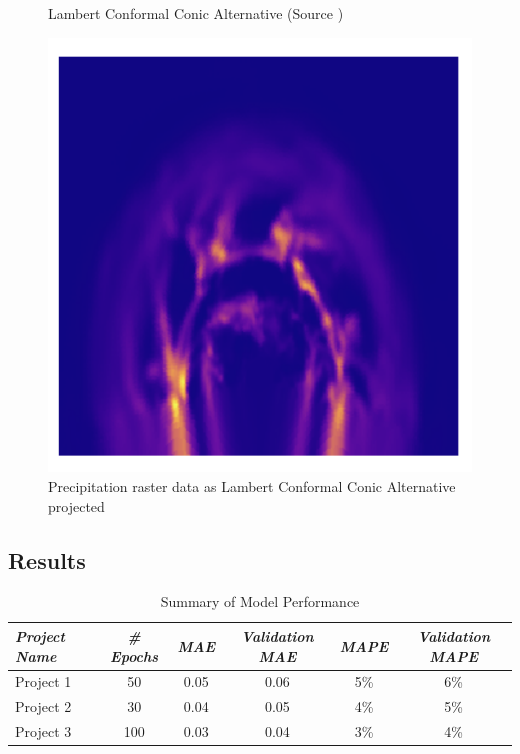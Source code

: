 \begin{figure}[h]
\begin{minipage}{0.30\textwidth}
        \caption{Lambert Conformal Conic Alternative (Source \cite{PROJ_SITE})}
        \label{fig:lcca_proj}
    \end{minipage}\hfill
    \begin{minipage}{0.30\textwidth}
        \centering
        \includegraphics[width=0.9\linewidth]{figures/chapter-8/prect_lcca.png}
        \caption{Precipitation raster data as Lambert Conformal Conic Alternative projected}
        \label{fig:lcca_prect_raster}
    \end{minipage}\hfill
\end{figure}

\subsection{Results}
\begin{table}[ht]
    \centering
    \caption{Summary of Model Performance}
    \label{conic_results_table}
    \renewcommand{\arraystretch}{1.2} %
    \begin{tabular}{|l|c|c|c|c|c|}
        \hline
        \rowcolor[gray]{0.9}
        \textbf{\emph{Project Name}} & \textbf{\emph{\# Epochs}} & \textbf{\emph{MAE}} & \textbf{\emph{Validation MAE}} & \textbf{\emph{MAPE}} & \textbf{\emph{Validation MAPE}} \\ \hline
        Project 1                    & 50                        & 0.05                & 0.06                           & 5\%                  & 6\%                             \\ \hline
        Project 2                    & 30                        & 0.04                & 0.05                           & 4\%                  & 5\%                             \\ \hline
        Project 3                    & 100                       & 0.03                & 0.04                           & 3\%                  & 4\%                             \\ \hline
    \end{tabular}
\end{table}
